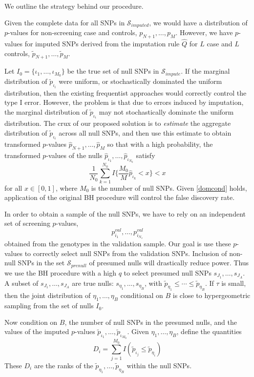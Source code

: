 \documentclass[12pt]{article}
\begin{document}
We outline the strategy behind our procedure.

Given the complete data for all SNPs in $\mathcal{S}_{imputed}$,
we would have a distribution of $p$-values for non-screening case and controls,
$p_{N+1},\hdots,p_M$.
However,
we have $p$-values for imputed SNPs derived from the imputation rule $\hat{Q}$
for $L$ case and $L$ controls,
$\tilde{p}_{N+1},\hdots,\tilde{p}_M$.

Let $I_0 = \{\iota_1,\hdots,\iota_{M_0}\}$ be the true set of null
SNPs in $\mathcal{S}_{impute}$.
If the marginal distribution of $\tilde{p}_{\iota_i}$ were uniform,
or stochastically dominated the uniform distribution,
then the existing frequentist approaches would correctly control the
type I error.
However, the problem is that due to errors induced by imputation,
the marginal distribution of $\tilde{p}_{\iota_i}$ may not
stochastically
dominate the uniform distribution.
The crux of our proposed solution is to \emph{estimate}
the aggregate distribution of $\tilde{p}_{\iota_i}$ across all null
SNPs,
and then use this estimate to obtain transformed $p$-values
$\hat{p}_{N+1},\hdots,\hat{p}_{M}$
so that with a high probability, the transformed $p$-values of the nulls
$\hat{p}_{\iota_1},\hdots,\hat{p}_{\iota_{N_0}}$
satisfy
\begin{equation}\label{domcond}
\frac{1}{N_0}\sum_{k=1}^{N_0} I\{\frac{M_0}{M}\hat{p}_{\iota_k} < x\} < x
\end{equation}
for all $x \in [0,1]$,
where $M_0$ is the number of null SNPs.
Given \eqref{domcond} holds, application of the original BH
procedure\cite{Benjamini1995} will control the false discovery rate.

In order to obtain a sample of the null SNPs, we have to rely
on an independent set of screening $p$-values,
\[
p^{val}_{i_1},\hdots,p^{val}_{i_{N_v}}
\]
obtained from the genotypes in the validation sample.
Our goal is use these $p$-values to correctly select null SNPs from
the validation SNPs.
Inclusion of non-null SNPs in the set $\mathcal{S}_{prenull}$
of presumed nulls will drastically reduce power.
Thus we use the BH procedure with a high $q$ to select presumed null
SNPs $s_{J_1},\hdots,s_{J_A}$.
A subset of $s_{J_1},\hdots,s_{J_A}$ are true nulls:
$s_{\eta_1},\hdots,s_{\eta_B}$,
with $\tilde{p}_{\eta_1} \leq \cdots \leq \tilde{p}_{\eta_B}$.
If $\tau$ is small, then the joint distribution of
$\eta_1,\hdots,\eta_B$ conditional on $B$
is close to hypergeometric sampling from the set of nulls $I_0$.

Now condition on $B$, the number of null SNPs in the presumed nulls,
and the values of the imputed $p$-values
$\tilde{p}_{\iota_1},\hdots,\tilde{p}_{\iota_{M_0}}$.
Given $\eta_1,\hdots,\eta_B$, define the quantities
\[
D_i = \sum_{j=1}^{M_0} I(\tilde{p}_{\iota_j} \leq \tilde{p}_{\eta_i})
\]
These $D_i$ are the ranks of the
$\tilde{p}_{\eta_1},\hdots,\tilde{p}_{\eta_B}$
within the null SNPs.
\end{document}
